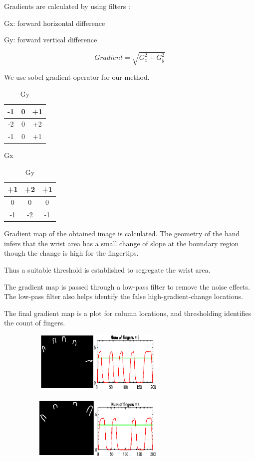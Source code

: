 \documentclass[conference]{IEEEtran}
\begin{document}
Gradients are calculated by using filters :

Gx: forward horizontal difference 

Gy: forward vertical difference

\[
     Gradient = \sqrt{G_x^2 + G_y^2} 
\]

We use sobel gradient operator for our method.
\begin{table}
\parbox{.45\linewidth}{
\centering
\begin{tabular}{|c|c|c|}
\hline
-1&0&+1\\ \hline
-2&0&+2\\ \hline
-1&0&+1\\ \hline
\end{tabular}
\caption{Gx}
}
\hfill
\parbox{.45\linewidth}{
\centering
\begin{tabular}{|c|c|c|}
\hline
+1&+2&+1\\ \hline
0&0&0\\ \hline
-1&-2&-1\\ \hline
\end{tabular}
\caption{Gy}
}
\end{table}

Gradient map of the obtained image is calculated. The geometry of the hand infers that the wrist area has a small change of slope at the boundary region though the change is high for the fingertips.

Thus a suitable threshold is established to segregate the wrist area.

The gradient map is passed through a low-pass filter to remove the noise effects. The low-pass filter also helps identify the false high-gradient-change locations.

The final gradient map is a plot for column locations, and thresholding identifies the count of fingers.

\begin{figure}[h!]
	\centering
	\includegraphics[width = 8cm, height = 3cm]{fin5m2}
\end{figure}

\begin{figure}[h!]
	\centering
	\includegraphics[width = 8cm, height = 3cm]{fin4m2}
\end{figure}
\end{document}
